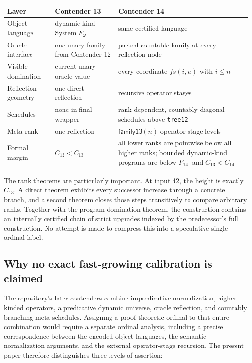 \documentclass[11pt]{article}
\theoremstyle{definition}
\theoremstyle{remark}
\newcommand{\lean}[1]{\texttt{#1}}
\newcommand{\C}[1]{C_{#1}}
\begin{document}
\begin{center}
\small
\begin{tabular}{>{\raggedright\arraybackslash}p{}
                >{\raggedright\arraybackslash}p{}
                >{\raggedright\arraybackslash}p{}}
\toprule
Layer & Contender 13 & Contender 14 \\
\midrule
Object language & dynamic-kind System $F_\omega$ & same certified language \\
Oracle interface & one unary family from Contender 12 & packed countable family at every reflection node \\
Visible domination & current unary oracle value & every coordinate $fs(i,n)$ with $i\le n$ \\
Reflection geometry & one direct reflection & recursive operator stages \\
Schedules & none in final wrapper & rank-dependent, countably diagonal schedules above \lean{tree12} \\
Meta-rank & one reflection & $\mathsf{family13}(n)$ operator-stage levels \\
Formal margin & $\C{12}<\C{13}$ & all lower ranks are pointwise below all higher ranks; bounded dynamic-kind programs are below $F_{14}$; and $\C{13}<\C{14}$ \\
\bottomrule
\end{tabular}
\end{center}

The rank theorems are particularly important.  At input 42, the height is
exactly $\C{13}$.  A direct theorem exhibits every successor increase through
a concrete branch, and a second theorem closes those steps transitively to
compare arbitrary ranks.  Together with the program-domination theorem, the
construction contains an internally certified chain of strict upgrades indexed
by the predecessor's full construction.  No attempt is made to compress this into a speculative
single ordinal label.

\subsection{Why no exact fast-growing calibration is claimed}

The repository's later contenders combine impredicative normalization,
higher-kinded operators, a predicative dynamic universe, oracle reflection,
and countably branching meta-schedules.  Assigning a proof-theoretic ordinal to
that entire combination would require a separate ordinal analysis, including a
precise correspondence between the encoded object languages, the semantic
normalization arguments, and the external operator-stage recursion.  The
present paper therefore distinguishes three levels of assertion:
\end{document}
